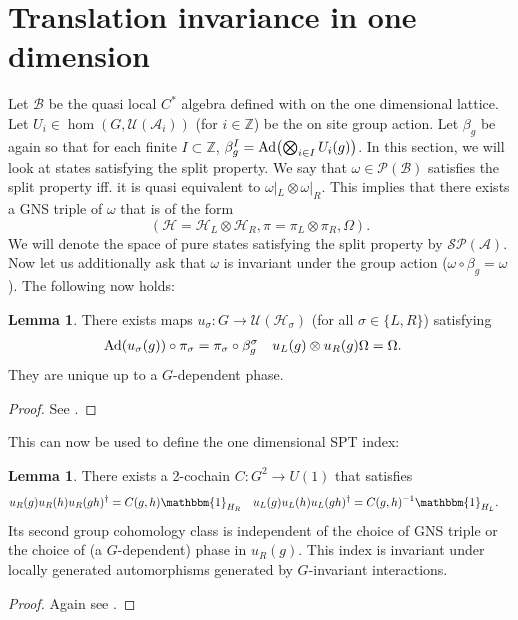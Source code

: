 \documentclass[12pt,a4paper,twoside]{article}
\let\originalleft\left
\let\originalright\right
\renewcommand{\left}{\mathopen{}\mathclose\bgroup\originalleft}
\renewcommand{\right}{\aftergroup\egroup\originalright}
\newcommand{\UU}{\mathcal U}
\newcommand{\BB}{\mathcal B}
\newcommand{\PP}{\mathcal P}
\newcommand{\HH}{\mathcal H}
\newcommand{\ZZ}{\mathbb Z}
\renewcommand{\AA}{\mathcal A}
\newcommand{\id}{\mathbbm{1}}
\newcommand{\Ad}[1]{\textrm{Ad}\left(#1\right)}
\theoremstyle{definition}
\newtheorem{lemma}[theorem]{Lemma}
\numberwithin{equation}{section}
\begin{document}
\section{Translation invariance in one dimension}\label{sec:OneDimensionalIndices}
Let $\BB$ be the quasi local $C^*$ algebra defined with on the one dimensional lattice. Let $U_i\in\hom(G,\UU(\AA_i))$ (for $i\in\ZZ$) be the on site group action. Let $\beta_g$ be again so that for each finite $I\subset \ZZ$, $\beta_g^I=\Ad{\bigotimes_{i\in I}U_i(g)}$. In this section, we will look at states satisfying the split property. We say that $\omega\in\PP(\BB)$ satisfies the split property iff. it is quasi equivalent to $\omega|_{L}\otimes\omega|_{R}$. This implies that there exists a GNS triple of $\omega$ that is of the form
\begin{equation}
	(\HH=\HH_L\otimes\HH_R,\pi=\pi_L\otimes\pi_R,\Omega).
\end{equation}
We will denote the space of pure states satisfying the split property by $\mathcal{S}\PP(\AA)$. Now let us additionally ask that $\omega$ is invariant under the group action ($\omega\circ\beta_g=\omega$). The following now holds:
\begin{lemma}
	There exists maps $u_\sigma:G\rightarrow \UU(\HH_\sigma)$ (for all $\sigma\in\{L,R\}$) satisfying
	\begin{align}
		\Ad{u_\sigma(g)}\circ\pi_\sigma&=\pi_\sigma\circ\beta_g^\sigma&u_L(g)\otimes u_R(g)\Omega&=\Omega.
	\end{align}
	They are unique up to a $G$-dependent phase.
\end{lemma}
\begin{proof}
	See \cite{ogata2019classification}.
\end{proof}
This can now be used to define the one dimensional SPT index:
\begin{lemma}
	There exists a 2-cochain $C:G^2\rightarrow U(1)$ that satisfies
	\begin{align}
		u_R(g)u_R(h)u_R(gh)^{\dagger}&=C(g,h)\id_{H_R}&u_L(g)u_L(h)u_L(gh)^{\dagger}&=C(g,h)^{-1}\id_{H_L}.
	\end{align}
	Its second group cohomology class is independent of the choice of GNS triple or the choice of (a $G$-dependent) phase in $u_R(g)$. This index is invariant under locally generated automorphisms generated by $G$-invariant interactions.
\end{lemma}
\begin{proof}
	Again see \cite{ogata2019classification}.
\end{proof}
\end{document}
